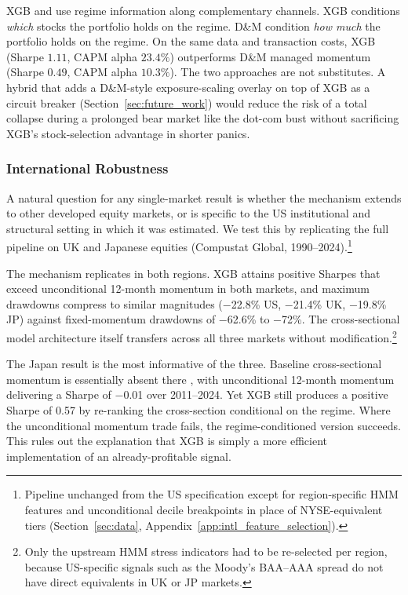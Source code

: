 XGB and \citet{DanielMoskowitz2016} use regime information along complementary channels. XGB conditions \emph{which} stocks the portfolio holds on the regime. D\&M condition \emph{how much} the portfolio holds on the regime. On the same data and transaction costs, XGB (Sharpe $1.11$, CAPM alpha $23.4\%$) outperforms D\&M managed momentum (Sharpe $0.49$, CAPM alpha $10.3\%$). The two approaches are not substitutes. A hybrid that adds a D\&M-style exposure-scaling overlay on top of XGB as a circuit breaker (Section~\ref{sec:future_work}) would reduce the risk of a total collapse during a prolonged bear market like the dot-com bust without sacrificing XGB's stock-selection advantage in shorter panics.

\subsubsection{International Robustness}\label{sec:international}

A natural question for any single-market result is whether the mechanism extends to other developed equity markets, or is specific to the US institutional and structural setting in which it was estimated. We test this by replicating the full pipeline on UK and Japanese equities (Compustat Global, 1990--2024).\footnote{Pipeline unchanged from the US specification except for region-specific HMM features and unconditional decile breakpoints in place of NYSE-equivalent tiers (Section~\ref{sec:data}, Appendix~\ref{app:intl_feature_selection}).}



The mechanism replicates in both regions. XGB attains positive Sharpes that exceed unconditional 12-month momentum in both markets, and maximum drawdowns compress to similar magnitudes ($-$22.8\% US, $-$21.4\% UK, $-$19.8\% JP) against fixed-momentum drawdowns of $-$62.6\% to $-$72\%. The cross-sectional model architecture itself transfers across all three markets without modification.\footnote{Only the upstream HMM stress indicators had to be re-selected per region, because US-specific signals such as the Moody's BAA--AAA spread do not have direct equivalents in UK or JP markets.}

The Japan result is the most informative of the three. Baseline cross-sectional momentum is essentially absent there \citep{Asness2013}, with unconditional 12-month momentum delivering a Sharpe of $-$0.01 over 2011--2024. Yet XGB still produces a positive Sharpe of 0.57 by re-ranking the cross-section conditional on the regime. Where the unconditional momentum trade fails, the regime-conditioned version succeeds. This rules out the explanation that XGB is simply a more efficient implementation of an already-profitable signal.

